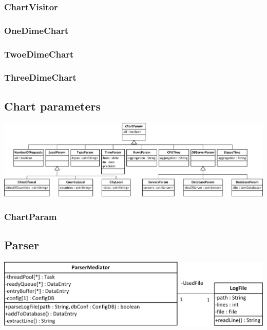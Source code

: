\subsubsection*{ChartVisitor}
\subsubsection*{OneDimeChart}
\subsubsection*{TwoeDimeChart}
\subsubsection*{ThreeDimeChart} 


\subsection{Chart parameters}
\begin{center}
\includegraphics[width=1\linewidth]{Pictures/Parts/ChartPara.png}
\end{center}  
\subsubsection*{ChartParam} 


\subsection{Parser}

\begin{center}
\includegraphics{Pictures/Parts/ParsMedi.png}
\end{center}  

